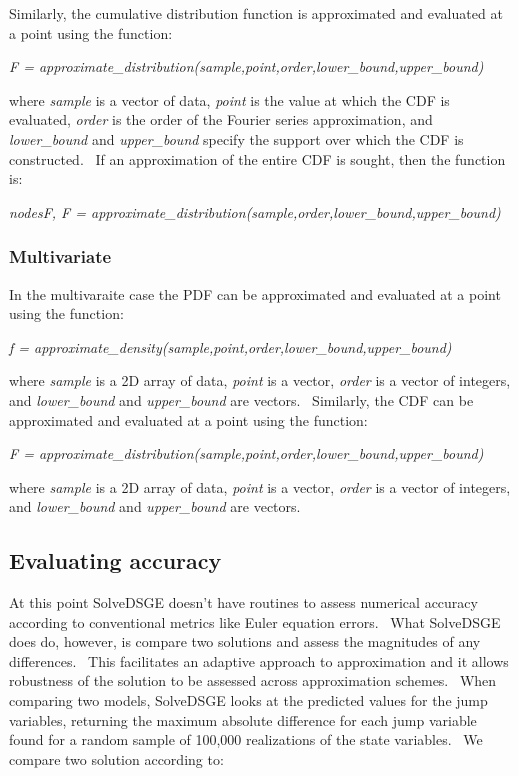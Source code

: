\documentclass[notitlepage,11pt]{article}
\begin{document}
Similarly, the cumulative distribution function is approximated and
evaluated at a point using the function:

\bigskip

\textit{F =
approximate\_distribution(sample,point,order,lower\_bound,upper\_bound)}

\bigskip

where \textit{sample} is a vector of data, \textit{point} is the value at
which the CDF is evaluated, \textit{order} is the order of the Fourier
series approximation, and \textit{lower\_bound} and \textit{upper\_bound}
specify the support over which the CDF is constructed. \ If an approximation
of the entire CDF is sought, then the function is:

\bigskip

\textit{nodesF, F =
approximate\_distribution(sample,order,lower\_bound,upper\_bound)}

\bigskip

\subsubsection{Multivariate}

In the multivaraite case the PDF can be approximated and evaluated at a
point using the function:

\bigskip

\textit{f =
approximate\_density(sample,point,order,lower\_bound,upper\_bound)}

\bigskip

where \textit{sample} is a 2D array of data, \textit{point} is a vector, 
\textit{order} is a vector of integers, and \textit{lower\_bound} and 
\textit{upper\_bound} are vectors. \ Similarly, the CDF can be approximated
and evaluated at a point using the function:

\bigskip

\textit{F =
approximate\_distribution(sample,point,order,lower\_bound,upper\_bound)}

\bigskip

where \textit{sample} is a 2D array of data, \textit{point} is a vector, 
\textit{order} is a vector of integers, and \textit{lower\_bound} and 
\textit{upper\_bound} are vectors.

\subsection{Evaluating accuracy}

At this point SolveDSGE doesn't have routines to assess numerical accuracy
according to conventional metrics like Euler equation errors. \ What
SolveDSGE does do, however, is compare two solutions and assess the
magnitudes of any differences. \ This facilitates an adaptive approach to
approximation and it allows robustness of the solution to be assessed across
approximation schemes. \ When comparing two models, SolveDSGE looks at the
predicted values for the jump variables, returning the maximum absolute
difference for each jump variable found for a random sample of 100,000
realizations of the state variables. \ We compare two solution according to:
\end{document}
